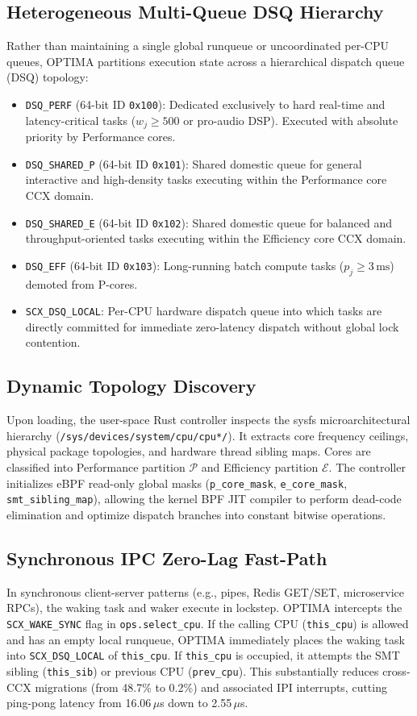 \documentclass[conference]{IEEEtran}
\begin{document}
\subsection{Heterogeneous Multi-Queue DSQ Hierarchy}
Rather than maintaining a single global runqueue or uncoordinated per-CPU queues, OPTIMA partitions execution state across a hierarchical dispatch queue (DSQ) topology:
\begin{itemize}
    \item \texttt{DSQ\_PERF} (64-bit ID \texttt{0x100}): Dedicated exclusively to hard real-time and latency-critical tasks ($w_j \ge 500$ or pro-audio DSP). Executed with absolute priority by Performance cores.
    \item \texttt{DSQ\_SHARED\_P} (64-bit ID \texttt{0x101}): Shared domestic queue for general interactive and high-density tasks executing within the Performance core CCX domain.
    \item \texttt{DSQ\_SHARED\_E} (64-bit ID \texttt{0x102}): Shared domestic queue for balanced and throughput-oriented tasks executing within the Efficiency core CCX domain.
    \item \texttt{DSQ\_EFF} (64-bit ID \texttt{0x103}): Long-running batch compute tasks ($p_j \ge 3\,\text{ms}$) demoted from P-cores.
    \item \texttt{SCX\_DSQ\_LOCAL}: Per-CPU hardware dispatch queue into which tasks are directly committed for immediate zero-latency dispatch without global lock contention.
\end{itemize}

\subsection{Dynamic Topology Discovery}
Upon loading, the user-space Rust controller inspects the sysfs microarchitectural hierarchy (\texttt{/sys/devices/system/cpu/cpu*/}). It extracts core frequency ceilings, physical package topologies, and hardware thread sibling maps. Cores are classified into Performance partition $\mathcal{P}$ and Efficiency partition $\mathcal{E}$. The controller initializes eBPF read-only global masks (\texttt{p\_core\_mask}, \texttt{e\_core\_mask}, \texttt{smt\_sibling\_map}), allowing the kernel BPF JIT compiler to perform dead-code elimination and optimize dispatch branches into constant bitwise operations.

\subsection{Synchronous IPC Zero-Lag Fast-Path}
In synchronous client-server patterns (e.g., pipes, Redis GET/SET, microservice RPCs), the waking task and waker execute in lockstep. OPTIMA intercepts the \texttt{SCX\_WAKE\_SYNC} flag in \texttt{ops.select\_cpu}. If the calling CPU (\texttt{this\_cpu}) is allowed and has an empty local runqueue, OPTIMA immediately places the waking task into \texttt{SCX\_DSQ\_LOCAL} of \texttt{this\_cpu}. If \texttt{this\_cpu} is occupied, it attempts the SMT sibling (\texttt{this\_sib}) or previous CPU (\texttt{prev\_cpu}). This substantially reduces cross-CCX migrations (from 48.7\% to 0.2\%) and associated IPI interrupts, cutting ping-pong latency from 16.06\,$\mu$s down to 2.55\,$\mu$s.
\end{document}
